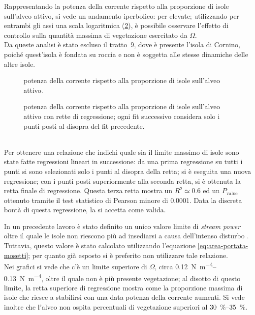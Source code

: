 Rappresentando la potenza della corrente rispetto alla proporzione di isole sull'alveo attivo, si vede un andamento iperbolico: per elevate; utilizzando per entrambi gli assi una scala logaritmica (\cref{graph:omega-area-percentuale}), è possibile osservare l'effetto di controllo sulla quantità massima di vegetazione esercitato da $\Omega$.
\\
Da queste analisi è stato escluso il tratto~9, dove è presente l'isola di Cornino, poiché quest'isola è fondata su roccia e non è soggetta alle stesse dinamiche delle altre isole.
%
\begin{figure}
	\centering
	
	\caption[potenza della corrente rispetto alla proporzione di isole sull'alveo attivo, grafico lineare]{potenza della corrente rispetto alla proporzione di isole sull'alveo attivo.}
	\label{graph:omega-area-percentuale-linear}
\end{figure}
%
\begin{figure}
	\centering
	
	\caption[potenza della corrente rispetto alla proporzione di isole sull'alveo attivo, grafico bilogaritmico]{potenza della corrente rispetto alla proporzione di isole sull'alveo attivo con rette di regressione; ogni fit successivo considera solo i punti posti al disopra del fit precedente.}
	\label{graph:omega-area-percentuale}
\end{figure}
%
%	
%
\\
Per ottenere una relazione che indichi quale sia il limite massimo di isole sono state fatte regressioni lineari in successione: da una prima regressione su tutti i punti si sono selezionati solo i punti al disopra della retta; si è eseguita una nuova regressione; con i punti posti superiormente alla seconda retta, si è ottenuta la retta finale di regressione.
Questa terza retta mostra un $R^2 \simeq 0.6$ ed un $P_\mathrm{value}$ ottenuto tramite il test statistico di Pearson minore di \num{0.0001}.
Data la discreta bontà di questa regressione, la si accetta come valida.


In un precedente lavoro è stato definito un unico valore limite di \emph{stream power} oltre il quale le isole non riescono più ad insediarsi a causa dell'intenso disturbo .
Tuttavia, questo valore è stato calcolato utilizzando l'equazione \eqref{eq:area-portata-mosetti}; per quanto già esposto si è preferito non utilizzare tale relazione.
\\
Nei grafici si vede che c'è un limite superiore di $\Omega$, circa \SIrange[range-phrase={-}]{0.12}{0.13}{\newton\per\metre\tothe{4}}, oltre il quale non è più presente vegetazione; al disotto di questo limite, la retta superiore di regressione mostra come la proporzione massima di isole che riesce a stabilirsi con una data potenza della corrente aumenti.
Si vede inoltre che l'alveo non ospita percentuali di vegetazione superiori al \SIrange[range-phrase={-}]{30}{35}{\percent}.

